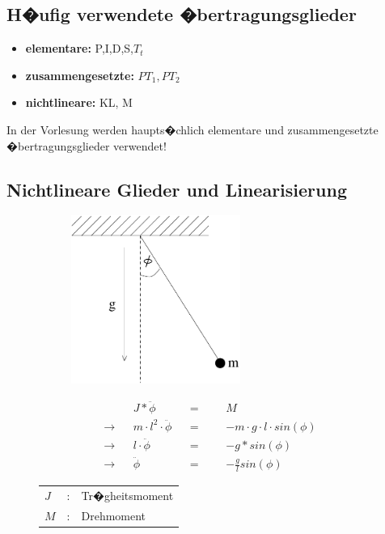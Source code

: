 \documentclass[12pt,a4paper,ngerman]{scrartcl}
\begin{document}
\subsection{H�ufig verwendete �bertragungsglieder}

\begin{itemize}
\item \textbf{elementare: }P,I,D,S,$T_t$
\item \textbf{zusammengesetzte: } $PT_1, PT_2$
\item \textbf{nichtlineare: } KL, M
\end{itemize}
In der Vorlesung werden haupts�chlich elementare und zusammengesetzte �bertragungsglieder verwendet!

\subsection{Nichtlineare Glieder und Linearisierung}

\begin{figure}[H]
  \begin{minipage}{.4\linewidth} %
\begin{figure}[H]
\includegraphics[height=5.5cm]{sysregel_bsp6} %
\end{figure}
 \end{minipage}%
  \begin{minipage}{.6\linewidth} %
   \begin{align*}
    &&J*\ddot{\phi}&&=&&&M\\
\rightarrow&& m\cdot l^2 \cdot \ddot{\phi} &&=&&& -m\cdot g \cdot l \cdot sin(\phi)\\
\rightarrow&& l \cdot \ddot{\phi}&&=&&&-g*sin(\phi)\\
\rightarrow&& \ddot{\phi}&&=&&& -\frac{g}{l}sin(\phi)
   \end{align*}
   \begin{tabular}{lll}
$J$&:& Tr�gheitsmoment\\
$M$&:& Drehmoment
  
   \end{tabular}

\end{minipage}%
\end{figure}
\end{document}
